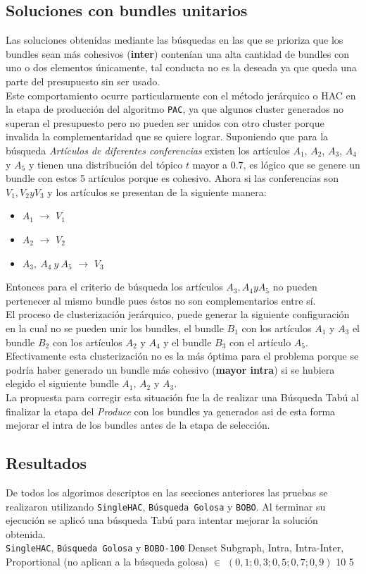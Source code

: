 \subsection{Soluciones con bundles unitarios}
Las soluciones obtenidas mediante las búsquedas en las que se prioriza que los bundles sean más cohesivos (\textbf{inter}) contenían una alta cantidad de bundles con uno o dos elementos únicamente, tal conducta no es la deseada ya que queda una parte del presupuesto sin ser usado.\\
Este comportamiento ocurre particularmente con el método jerárquico o HAC en la etapa de producción del algoritmo \texttt{PAC}, ya que algunos cluster generados no superan el presupuesto pero no pueden ser unidos con otro cluster porque invalida la complementaridad que se quiere lograr. Suponiendo que para la búsqueda \textit{Artículos de diferentes conferencias} existen los artículos $A_1$, $A_2$, $A_3$, $A_4$ y $A_5$ y tienen una distribución del tópico $t$ mayor a $0.7$, es lógico que se genere un bundle con estos 5 artículos porque es cohesivo. Ahora si las conferencias son $V_1, V_2 y V_3$ y los artículos se presentan de la siguiente manera:
\begin{itemize}
	\item $A_1$ $\rightarrow$ $V_1$
	\item $A_2$ $\rightarrow$ $V_2$
	\item $A_3,\ A_4\ y\ A_5$ $\rightarrow$ $V_3$
\end{itemize} 

Entonces para el criterio de búsqueda los artículos $A_3, A_4 y A_5$ no pueden pertenecer al mismo bundle pues éstos no son complementarios entre sí.\\
El proceso de clusterización jerárquico, puede generar la siguiente configuración en la cual no se pueden unir los bundles, el bundle $B_1$ con los artículos $A_1$ y $A_3$ el bundle $B_2$ con los artículos $A_2$ y $A_4$ y el bundle $B_3$ con el artículo $A_5$. Efectivamente esta clusterización no es la más óptima para el problema porque se podría haber generado un bundle más cohesivo (\textbf{mayor intra}) si se hubiera elegido el siguiente bundle $A_1$, $A_2$ y $A_3$.\\
La propuesta para corregir esta situación fue la de realizar una Búsqueda Tabú al finalizar la etapa del \textit{Produce} con los bundles ya generados asi de esta forma mejorar el intra de los bundles antes de la etapa de selección.
\subsection{Resultados}
De todos los algorimos descriptos en las secciones anteriores las pruebas se realizaron utilizando \texttt{SingleHAC}, \texttt{Búsqueda Golosa} y \texttt{BOBO}. Al terminar su ejecución se aplicó una búsqueda Tabú para intentar mejorar la solución obtenida.\\
\Solucion
{}
{\texttt{SingleHAC}, \texttt{Búsqueda Golosa} y \texttt{BOBO-100}}
{Denset Subgraph, Intra, Intra-Inter, Proportional (no aplican a la búsqueda golosa)}
{$\in$ $(0,1; 0,3; 0,5; 0,7; 0,9)$}
{10}
{5}

